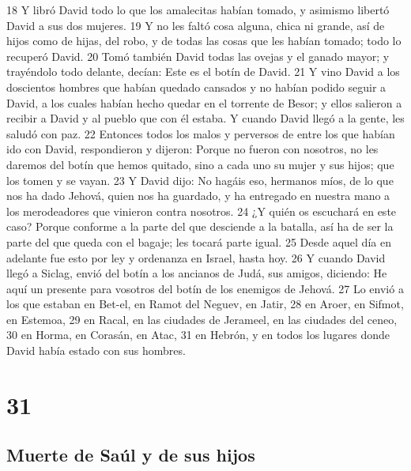 18 Y libró David todo lo que los amalecitas habían tomado, y asimismo libertó David a sus dos mujeres.
19 Y no les faltó cosa alguna, chica ni grande, así de hijos como de hijas, del robo, y de todas las cosas que les habían tomado; todo lo recuperó David.
20 Tomó también David todas las ovejas y el ganado mayor; y trayéndolo todo delante, decían: Este es el botín de David.
21 Y vino David a los doscientos hombres que habían quedado cansados y no habían podido seguir a David, a los cuales habían hecho quedar en el torrente de Besor; y ellos salieron a recibir a David y al pueblo que con él estaba. Y cuando David llegó a la gente, les saludó con paz.
22 Entonces todos los malos y perversos de entre los que habían ido con David, respondieron y dijeron: Porque no fueron con nosotros, no les daremos del botín que hemos quitado, sino a cada uno su mujer y sus hijos; que los tomen y se vayan.
23 Y David dijo: No hagáis eso, hermanos míos, de lo que nos ha dado Jehová, quien nos ha guardado, y ha entregado en nuestra mano a los merodeadores que vinieron contra nosotros.
24 ¿Y quién os escuchará en este caso? Porque conforme a la parte del que desciende a la batalla, así ha de ser la parte del que queda con el bagaje; les tocará parte igual.
25 Desde aquel día en adelante fue esto por ley y ordenanza en Israel, hasta hoy.
26 Y cuando David llegó a Siclag, envió del botín a los ancianos de Judá, sus amigos, diciendo: He aquí un presente para vosotros del botín de los enemigos de Jehová.
27 Lo envió a los que estaban en Bet-el, en Ramot del Neguev, en Jatir,
28 en Aroer, en Sifmot, en Estemoa,
29 en Racal, en las ciudades de Jerameel, en las ciudades del ceneo,
30 en Horma, en Corasán, en Atac,
31 en Hebrón, y en todos los lugares donde David había estado con sus hombres.

\chapter{31}

\section*{Muerte de Saúl y de sus hijos }


